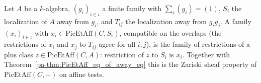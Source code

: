 \begin{theorem}
  \label{pa-thm:PicEtAff_exists_mapAlg_eq_of_compat}
  \leanok

  Let \(A\) be a \(k\)-algebra, \((g_i)_{i \in \iota}\) a finite family with \(\sum_i (g_i) = (1)\),
  \(S_i\) the localization of \(A\) away from \(g_i\), and \(T_{ij}\) the localization away from
  \(g_i g_j\). A family \((x_i)_{i \in \iota}\) with \(x_i \in \mathrm{PicEtAff}(C, S_i)\),
  compatible on the overlaps (the restrictions of \(x_i\) and \(x_j\) to \(T_{ij}\) agree for all
  \(i, j\)), is the family of restrictions of a plus class \(z \in \mathrm{PicEtAff}(C, A)\):
  restriction of \(z\) to \(S_i\) is \(x_i\). Together with Theorem~\ref{pa-thm:PicEtAff_eq_of_away_eq}
  this is the Zariski sheaf property of \(\mathrm{PicEtAff}(C, -)\) on affine tests.
\end{theorem}
